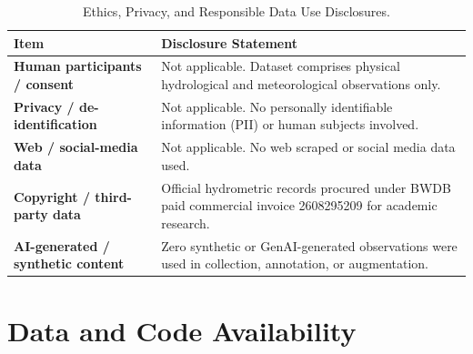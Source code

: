 \documentclass[11pt,a4paper]{article}
\begin{document}
\begin{table}[htbp]\centering\small
\caption{Ethics, Privacy, and Responsible Data Use Disclosures.}
\label{tab:ethics}
\begin{tabularx}{\linewidth}{|>{\bfseries}p{4.3cm}|X|}
\hline
\rowcolor{wordheadbg} \textbf{Item} & \textbf{Disclosure Statement} \\ \hline
\cellcolor{wordkeybg}Human participants / consent & Not applicable. Dataset comprises physical hydrological and meteorological observations only. \\ \hline
\cellcolor{wordkeybg}Privacy / de-identification & Not applicable. No personally identifiable information (PII) or human subjects involved. \\ \hline
\cellcolor{wordkeybg}Web / social-media data & Not applicable. No web scraped or social media data used. \\ \hline
\cellcolor{wordkeybg}Copyright / third-party data & Official hydrometric records procured under BWDB paid commercial invoice 2608295209 for academic research. \\ \hline
\cellcolor{wordkeybg}AI-generated / synthetic content & Zero synthetic or GenAI-generated observations were used in collection, annotation, or augmentation. \\ \hline
\end{tabularx}
\end{table}

\section{Data and Code Availability}
\end{document}
